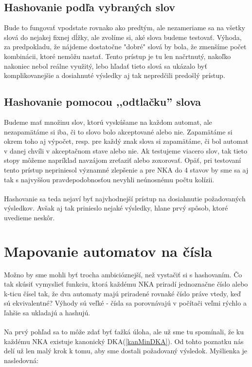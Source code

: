 \subsection{Hashovanie podľa vybraných slov}
Bude to fungovať vpodstate rovnako ako predtým, ale nezameriame sa na všetky slová do nejakej fixnej dĺžky, ale zvolíme si, aké slova budeme testovať. Výhoda, za predpokladu, že nájdeme dostatočne "dobré" slová by bola, že zmenšíme počet kombinácii, ktoré nemôžu nastať. Tento prístup je tu len načrtnutý, nakoľko nakoniec nebol reálne využitý, lebo hľadať tieto slová sa ukázalo byť komplikovanejšie a dosiahnuté výsledky aj tak nepredčili predošlý prístup.

\subsection{Hashovanie pomocou ,,odtlačku'' slova}
Budeme mať množinu slov, ktorú vyskúšame na každom automat, ale nezapamätáme si iba, či to slovo bolo akceptované alebo nie. Zapamätáme si okrem toho aj výpočet, resp. pre každý znak slova si zapamätáme, či bol automat v danej chvíli v akceptačnom stave alebo nie. Ak testujeme viacero slov, tak tieto stopy môžeme napríklad navzájom zreťaziť alebo zoxorovať. Opäť, pri testovaní tento prístup nepriniesol významné zlepšenie a pre NKA do 4 stavov by sme sa aj tak s najvyššou pravdepodobnosťou nevyhli neúnosnému počtu kolízii.

\paragraph{}
Hashovanie sa teda nejaví byť najvhodnejší prístup na dosiahnutie požadovaných výsledkov. Avšak aj tak prinieslo nejaké výsledky, hlane prvý spôsob, ktoré uvedieme neskôr.

\section{Mapovanie automatov na čísla}

Možno by sme mohli byť trocha ambicióznejší, než vystačiť si s hashovaním. Čo tak skúsiť vymyslieť funkciu, ktorá každému NKA priradí jednoznačne číslo alebo k-ticu čísel tak, že dva automaty majú priradené rovnaké číslo práve vtedy, keď sú ekvivalentné? Výhody sú veľké - čísla sa porovnávajú v počítači veľmi rýchlo a ľahšie sa ukladajú a hashujú. 
\paragraph{}
Na prvý pohľad sa to môže zdať byť ťažká úloha, ale už sme tu spomínali, že ku každému NKA existuje kanonický DKA(\ref{kanMinDKA}). Od tohto poznatku nás delí už len malý krok k tomu, aby sme dostali požadovaný výsledok. Myšlienka je nasledovná:
